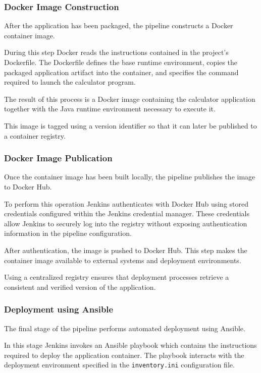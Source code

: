 \documentclass[12pt]{article}
\begin{document}
\subsubsection{Docker Image Construction}

After the application has been packaged, the pipeline constructs a Docker
container image.

During this step Docker reads the instructions contained in the project's
Dockerfile. The Dockerfile defines the base runtime environment, copies the
packaged application artifact into the container, and specifies the command
required to launch the calculator program.

The result of this process is a Docker image containing the calculator
application together with the Java runtime environment necessary to execute it.

This image is tagged using a version identifier so that it can later be
published to a container registry.

\subsubsection{Docker Image Publication}

Once the container image has been built locally, the pipeline publishes the
image to Docker Hub.

To perform this operation Jenkins authenticates with Docker Hub using stored
credentials configured within the Jenkins credential manager. These
credentials allow Jenkins to securely log into the registry without exposing
authentication information in the pipeline configuration.

After authentication, the image is pushed to Docker Hub. This step makes the
container image available to external systems and deployment environments.

Using a centralized registry ensures that deployment processes retrieve a
consistent and verified version of the application.

\subsubsection{Deployment using Ansible}

The final stage of the pipeline performs automated deployment using Ansible.

In this stage Jenkins invokes an Ansible playbook which contains the
instructions required to deploy the application container. The playbook
interacts with the deployment environment specified in the
\texttt{inventory.ini} configuration file.
\end{document}
